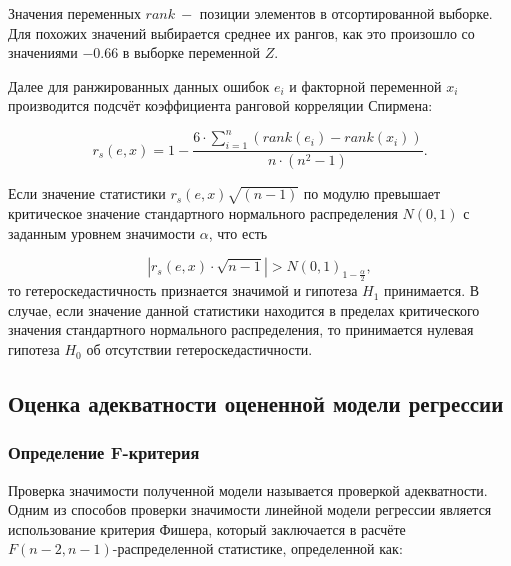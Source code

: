 \documentclass[
]{article}
\begin{document}
Значения переменных \(rank\ -\) позиции элементов в отсортированной
выборке. Для похожих значений выбирается среднее их рангов, как это
произошло со значениями \(-0.66\) в выборке переменной \(Z\).

Далее для ранжированных данных ошибок \(e_i\) и факторной переменной
\(x_i\) производится подсчёт коэффициента ранговой корреляции Спирмена:

\[
r_s(e, x) = 1 - \frac{6 \cdot \sum\limits_{i=1}^n (rank(e_i) - rank(x_i))}{n \cdot (n^2 - 1)}.
\]

Если значение статистики \(r_s(e, x) \sqrt{(n-1)}\) по модулю превышает
критическое значение стандартного нормального распределения \(N(0, 1)\)
с заданным уровнем значимости \(\alpha\), что есть

\[
|r_s(e, x) \cdot \sqrt{n-1}| > N(0, 1)_{1 - \frac{\alpha}{2}},
\] то гетероскедастичность признается значимой и гипотеза
\textbf{\(H_1\)} принимается. В случае, если значение данной статистики
находится в пределах критического значения стандартного нормального
распределения, то принимается нулевая гипотеза \textbf{\(H_0\)} об
отсутствии гетероскедастичности.

\hypertarget{ux43eux446ux435ux43dux43aux430-ux430ux434ux435ux43aux432ux430ux442ux43dux43eux441ux442ux438-ux43eux446ux435ux43dux435ux43dux43dux43eux439-ux43cux43eux434ux435ux43bux438-ux440ux435ux433ux440ux435ux441ux441ux438ux438}{%
\subsection{\texorpdfstring{\textbf{Оценка адекватности оцененной модели
регрессии}}{Оценка адекватности оцененной модели регрессии}}\label{ux43eux446ux435ux43dux43aux430-ux430ux434ux435ux43aux432ux430ux442ux43dux43eux441ux442ux438-ux43eux446ux435ux43dux435ux43dux43dux43eux439-ux43cux43eux434ux435ux43bux438-ux440ux435ux433ux440ux435ux441ux441ux438ux438}}

\hypertarget{ux43eux43fux440ux435ux434ux435ux43bux435ux43dux438ux435-f-ux43aux440ux438ux442ux435ux440ux438ux44f}{%
\subsubsection{\texorpdfstring{\textbf{Определение
F-критерия}}{Определение F-критерия}}\label{ux43eux43fux440ux435ux434ux435ux43bux435ux43dux438ux435-f-ux43aux440ux438ux442ux435ux440ux438ux44f}}

Проверка значимости полученной модели называется проверкой адекватности.
Одним из способов проверки значимости линейной модели регрессии является
использование критерия Фишера, который заключается в расчёте
\(F(n-2, n-1)\)-распределенной статистике, определенной как:
\end{document}
